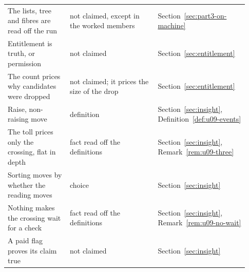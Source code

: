 \documentclass[11pt,twoside]{article}
\theoremstyle{thielethm}
\theoremstyle{thieledef}
\theoremstyle{thieledef}
\theoremstyle{thieledef}
\theoremstyle{thielethm}
\theoremstyle{thieleobs}
\theoremstyle{thielethm}
\begin{document}
\begin{longtable}{@{}>{\raggedright\arraybackslash}p{0.242\linewidth}>{\raggedright\arraybackslash}p{0.344\linewidth}>{\raggedright\arraybackslash}p{0.344\linewidth}@{}}
The lists, tree and fibres are read off the run & not claimed, except in the worked members & Section~\ref{sec:part3-on-machine} \\
Entitlement is truth, or permission & not claimed & Section~\ref{sec:entitlement} \\
The count prices why candidates were dropped & not claimed; it prices the size of the drop & Section~\ref{sec:entitlement} \\
Raise, non-raising move & definition & Section~\ref{sec:insight}, Definition~\ref{def:u09-events} \\
The toll prices only the crossing, flat in depth & fact read off the definitions & Section~\ref{sec:insight}, Remark~\ref{rem:u09-three} \\
Sorting moves by whether the reading moves & choice & Section~\ref{sec:insight} \\
Nothing makes the crossing wait for a check & fact read off the definitions & Section~\ref{sec:insight}, Remark~\ref{rem:u09-no-wait} \\
A paid flag proves its claim true & not claimed & Section~\ref{sec:insight} \\
\end{longtable}
\endgroup
\end{document}
